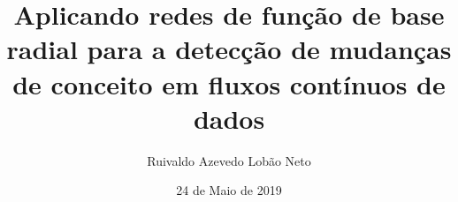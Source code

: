 \documentclass[qual, classic, a4paper]{ufbathesis}
\institute{Instituto de Matem\'{a}tica}
\title{Aplicando redes de função de base radial para a detecção de mudanças de conceito em fluxos contínuos de dados}
\date{24 de Maio de 2019}
\author{Ruivaldo Azevedo Lobão Neto}
\begin{document}
\pgcompfrontpage

\frontmatter

\pgcomppresentationpage










\resumo
\end{document}
